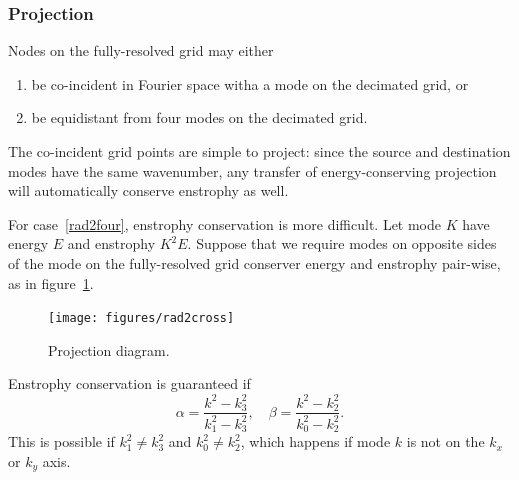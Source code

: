 \documentclass[10pt,showpacs,showkeys,%
amsfonts,amsmath,onecolumn,
floatfix,aps,superscriptaddress]{revtex4}
\begin{document}
\subsubsection{Projection}
Nodes on the fully-resolved grid may either
\begin{enumerate}
\item \label{rad2co}
  be co-incident in Fourier space witha a mode on the decimated grid, or
\item \label{rad2four}
  be equidistant from four modes on the decimated grid.
\end{enumerate}
The co-incident grid points are simple to project: since the source
and destination modes have the same wavenumber, any transfer of
energy-conserving projection will automatically conserve enstrophy as
well.

For case~\ref{rad2four}, enstrophy conservation is more difficult.
Let mode $K$ have energy $E$ and enstrophy $K^2E$.  Suppose that we
require modes on opposite sides of the mode on the fully-resolved grid
conserver energy and enstrophy pair-wise, as in figure~\ref{rad2cross}. 
\begin{figure}[htb]
  \begin{center}
    \texttt{[image: figures/rad2cross]}
    \caption{Projection diagram.}
    \label{rad2cross}
  \end{center}
\end{figure}
Enstrophy conservation is guaranteed if 
\begin{dmath}
  \alpha = \frac{k^2 -k_3^2}{ k_1^2 -k_3^2},
  \quad
  \beta = \frac{k^2 -k_2^2}{ k_0^2 -k_2^2}.
\end{dmath}
This is possible if $k_1^2 \neq k_3^2$ and $k_0^2 \neq k_2^2$, which
happens if mode $k$ is not on the $k_x$ or $k_y$ axis. %
\end{document}
